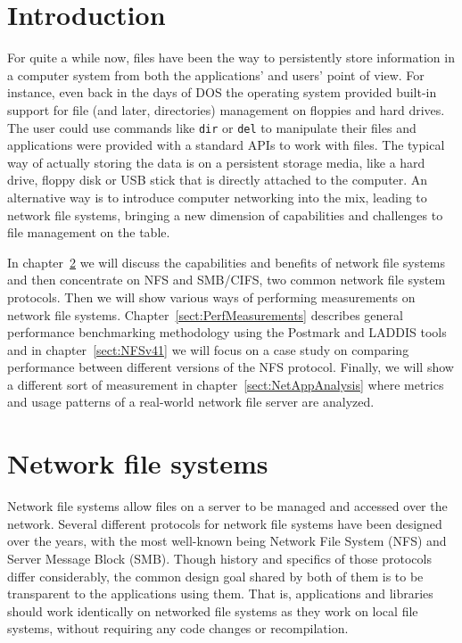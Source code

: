 \section{Introduction}

For quite a while now, files have been the way to persistently store information in a computer system
from both the applications' and users' point of view.
For instance, even back in the days of DOS the operating system provided built-in support
for file (and later, directories) management on floppies and hard drives.
The user could use commands like \texttt{dir} or \texttt{del} to manipulate their
files and applications were provided with a standard APIs to work with files.
The typical way of actually storing the data is on a persistent storage media,
like a hard drive, floppy disk or USB stick that is directly attached to the computer.
An alternative way is to introduce computer networking into the mix, leading to
network file systems, bringing a new dimension of capabilities and challenges to file
management on the table.

In chapter~\ref{sect:NetworkFileSystems} we will discuss the capabilities
and benefits of network file systems and then concentrate on NFS and SMB/CIFS, two common
network file system protocols.
Then we will show various ways of performing measurements on network file systems.
Chapter~\ref{sect:PerfMeasurements} describes general performance benchmarking methodology
using the Postmark and LADDIS tools and in chapter~\ref{sect:NFSv41} we will focus
on a case study on comparing performance between different versions of the NFS protocol.
Finally, we will show a different sort of measurement in chapter~\ref{sect:NetAppAnalysis}
where metrics and usage patterns of a real-world network file server are analyzed.

\section{Network file systems} \label{sect:NetworkFileSystems}
Network file systems allow files on a server to be managed and accessed over the network.
Several different protocols for network file systems have been designed over the years,
with the most well-known being Network File System (NFS) and 
Server Message Block (SMB).
Though history and specifics of those protocols differ considerably, the common design
goal shared by both of them is to be transparent to the applications using them.
That is, applications and libraries should work identically on networked file systems
as they work on local file systems, without requiring any code changes or recompilation.


